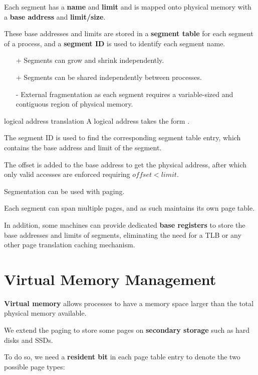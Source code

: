 Each segment has a \textbf{name} and \textbf{limit} and is mapped onto physical memory with a \textbf{base address} and \textbf{limit/size}.

These base addresses and limits are stored in a \textbf{segment table} for each segment
of a process, and a \textbf{segment ID} is used to identify each segment name.

\begin{itemize}
    \item[+] Segments can grow and shrink independently.
    \item[+] Segments can be shared independently between processes.
    \item[-] External fragmentation as each segment requires a variable-sized and contiguous region of physical memory.
\end{itemize}

\begin{defn}{logical address translation}
    A logical address takes the form .

    The segment ID is used to find the corresponding segment table entry, which contains the base address and limit of the segment.

    The offset is added to the base address to get the physical address, after which only valid accesses are enforced requiring $offset < limit$.
\end{defn}

Segmentation can be used with paging.

Each segment can span multiple pages, and as such maintains its own page table.

In addition, some machines can provide dedicated \textbf{base registers} to store the base addresses and limits of segments, eliminating the need for a TLB or any other page translation caching mechanism.


\section{Virtual Memory Management}

\textbf{Virtual memory} allows processes to have a memory space larger than the total physical memory available.

We extend the paging to store some pages on \textbf{secondary storage} such as hard disks and SSDs.

To do so, we need a \textbf{resident bit} in each page table entry to denote the two possible page types:

